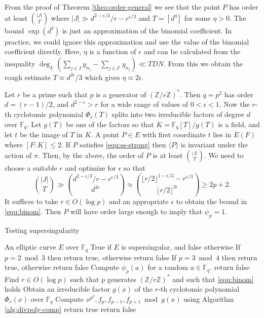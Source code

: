 \documentclass[12pt]{article}
\theoremstyle{plain}
\theoremstyle{definition}
\newcommand{\ang}[1]{\langle#1\rangle}
\newcommand{\abs}[1]{\left\vert#1\right\vert}
\def\Z{\ensuremath{\mathbb{Z}}}
\def\F{\ensuremath{\mathbb{F}}}
\begin{document}
From the proof of Theorem \ref{theo:order-general} we see that the point $P$ has order at least 
$\binom{\abs{J}}{T}$ where $\abs{J} \gg d^{2 - \epsilon / 3} / r - r^{\epsilon / 3}$ and $T = 
[d^\eta]$ for some $\eta > 0$. The bound $\exp(d^\delta)$ is just an approximation of the binomial 
coefficient. In practice, we could ignore this approximation and use the value of the binomial 
coefficient directly. Here, $\eta$ is a function of $\epsilon$ and can be calculated from the 
inequality $\deg_L(\sum_{j \in I}y_{n_j} - \sum_{j \in I'}y_{n_j}) \ll TDN $. From this we obtain 
the rough estimate $T \approx d^{2\epsilon} / 3$ which gives $\eta \approx 2\epsilon$. 

Let $r$ be a prime such that $p$ is a generator of $(\Z/r\Z)^*$. Then $q = p^2$ has order $d = (r - 
1) / 2$, and $d^{2 - \epsilon} > r$ for a wide range of values of $0 < \epsilon < 1$. Now the 
$r$-th cyclotomic polynomial $\Phi_r(T)$ splits into two irreducible factors of degree $d$ over 
$\F_q$. Let $g(T)$ be one of the factors so that $K = \F_q[T]/g(T)$ is a field, and let $t$ be the 
image of $T$ in $K$. A point $P \in E$ with first coordinate $t$ lies in $E(F)$ where $[F : K] \le 
2$. If $P$ satisfies \eqref{equ:ss-strong} then $\ang{P}$ is invariant under the action of $\pi$. 
Then, by the above, the order of $P$ is at least $\binom{\abs{J}}{T}$. We need to choose a suitable 
$r$ and optimize for $\epsilon$ so that
\begin{equation}
	\label{equ:binom}
	\binom{\abs{J}}{T} \gg \binom{d^{2 - \epsilon / 3} / r - r^{\epsilon / 3}}{d^{2\epsilon}} 
	\approx \binom{\lfloor r / 2 \rfloor^{1 - \epsilon / 3} - r^{\epsilon / 3}}{\lfloor r / 2 
	\rfloor^{2\epsilon}} \ge 2p + 2.
\end{equation}
It suffices to take $r \in O(\log p)$ and an appropriate $\epsilon$ to obtain the bound in 
\eqref{equ:binom}. Then $P$ will have order large enough to imply that $\psi_p = 1$. 

\begin{algorithm}[H]
	\caption{Testing supersingularity}
	\label{alg:ss-strong}
	\begin{algorithmic}[1]
		\Require An elliptic curve $E$ over $\F_q$
		\Ensure True if $E$ is supersingular, and false otherwise
			\State If $p = 2 \bmod 3$ then return true, otherwise return false
		\EndIf
			\State If $p = 3 \bmod 4$ then return true, otherwise return false
		\EndIf
		\State\label{step:ss-eval}%
		Compute $\psi_p(a)$ for a random $a \in \F_q$.
			\State return false
		\EndIf
		\State\label{step:ss-find-par}%
		Find $r \in O(\log p)$ such that $p$ generates $(\Z/r\Z)^*$ and such that \eqref{equ:binom} 
		holds
		\State\label{step:cyclo}%
		Obtain an irreducible factor $g(x)$ of the $r$-th cyclotomic polynomial $\Phi_r(x)$ over 
		$\F_q$
		\State\label{step:ss-psi}%
		Compute $x^{p^2}, f_p, f_{p - 1}, f_{p + 1} \bmod g(x)$ using Algorithm 
		\ref{alg:divpoly-comp}
			\State return true
		\Else
			\State return false
		\EndIf
	\end{algorithmic}
\end{algorithm}
\end{document}
